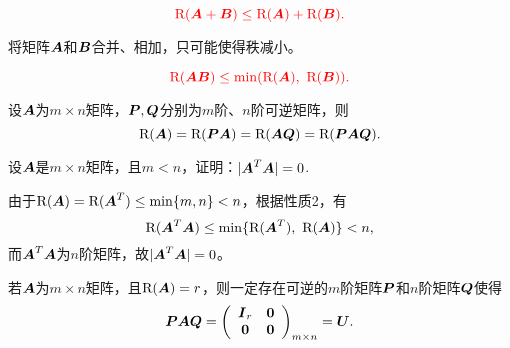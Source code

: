 \begin{frame}
  \begin{xingzhi}
    $$
    \red{\rank(\A+\B) \le \rank(\A)+\rank(\B).}
    $$
  \end{xingzhi}

  \begin{zhu*}
    将矩阵$\A$和$\B$合并、相加，只可能使得秩减小。
  \end{zhu*}

\end{frame}

\begin{frame}
  \begin{xingzhi}
    $$
    \red{\rank(\A\B) \le \min(\rank(\A),~\rank(\B)).}
    $$
  \end{xingzhi}


\end{frame}

\begin{frame}
  \begin{xingzhi}
    设$\A$为$m\times n$矩阵，$\PP,\QQ$分别为$m$阶、$n$阶可逆矩阵，则
    $$
    \rank(\A) = \rank(\PP\A) = \rank(\A\QQ)  = \rank(\PP\A\QQ).
    $$
  \end{xingzhi}
\end{frame}

\begin{frame}
  \begin{li}
    设$\A$是$m\times n$矩阵，且$m<n$，证明：$|\A^T\A|=0$.
  \end{li}
  \vspace{.1in}\pause 

  \begin{jie}
    由于$\rank(\A)=\rank(\A^T)\le \min\{m,n\}<n$，根据性质2，有
    $$
    \rank(\A^T\A) \le \min\{\rank(\A^T),~\rank(\A)\} < n,
    $$
    而$\A^T\A$为$n$阶矩阵，故$|\A^T\A|=0$。
  \end{jie}
\end{frame}




\begin{frame}
  \begin{dingli}
    若$\A$为$m\times n$矩阵，且$\rank(\A)=r$，则一定存在可逆的$m$阶矩阵$\PP$和$n$阶矩阵$\QQ$使得
    $$
    \PP\A\QQ=\left(
      \begin{array}{cc}
        \II_r&\zero\\
        \zero&\zero
      \end{array}
    \right)_{m\times n} = \U.
    $$
  \end{dingli}
\end{frame}


